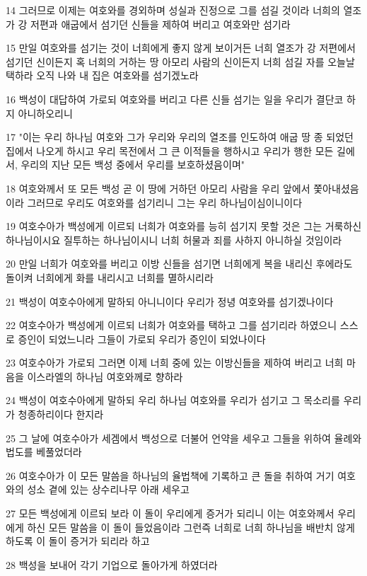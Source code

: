 \par 14 그러므로 이제는 여호와를 경외하며 성실과 진정으로 그를 섬길 것이라 너희의 열조가 강 저편과 애굽에서 섬기던 신들을 제하여 버리고 여호와만 섬기라
\par 15 만일 여호와를 섬기는 것이 너희에게 좋지 않게 보이거든 너희 열조가 강 저편에서 섬기던 신이든지 혹 너희의 거하는 땅 아모리 사람의 신이든지 너희 섬길 자를 오늘날 택하라 오직 나와 내 집은 여호와를 섬기겠노라
\par 16 백성이 대답하여 가로되 여호와를 버리고 다른 신들 섬기는 일을 우리가 결단코 하지 아니하오리니
\par 17 "이는 우리 하나님 여호와 그가 우리와 우리의 열조를 인도하여 애굽 땅 종 되었던 집에서 나오게 하시고 우리 목전에서 그 큰 이적들을 행하시고 우리가 행한 모든 길에서, 우리의 지난 모든 백성 중에서 우리를 보호하셨음이며"
\par 18 여호와께서 또 모든 백성 곧 이 땅에 거하던 아모리 사람을 우리 앞에서 쫓아내셨음이라 그러므로 우리도 여호와를 섬기리니 그는 우리 하나님이심이니이다
\par 19 여호수아가 백성에게 이르되 너희가 여호와를 능히 섬기지 못할 것은 그는 거룩하신 하나님이시요 질투하는 하나님이시니 너희 허물과 죄를 사하지 아니하실 것임이라
\par 20 만일 너희가 여호와를 버리고 이방 신들을 섬기면 너희에게 복을 내리신 후에라도 돌이켜 너희에게 화를 내리시고 너희를 멸하시리라
\par 21 백성이 여호수아에게 말하되 아니니이다 우리가 정녕 여호와를 섬기겠나이다
\par 22 여호수아가 백성에게 이르되 너희가 여호와를 택하고 그를 섬기리라 하였으니 스스로 증인이 되었느니라 그들이 가로되 우리가 증인이 되었나이다
\par 23 여호수아가 가로되 그러면 이제 너희 중에 있는 이방신들을 제하여 버리고 너희 마음을 이스라엘의 하나님 여호와께로 향하라
\par 24 백성이 여호수아에게 말하되 우리 하나님 여호와를 우리가 섬기고 그 목소리를 우리가 청종하리이다 한지라
\par 25 그 날에 여호수아가 세겜에서 백성으로 더불어 언약을 세우고 그들을 위하여 율례와 법도를 베풀었더라
\par 26 여호수아가 이 모든 말씀을 하나님의 율법책에 기록하고 큰 돌을 취하여 거기 여호와의 성소 곁에 있는 상수리나무 아래 세우고
\par 27 모든 백성에게 이르되 보라 이 돌이 우리에게 증거가 되리니 이는 여호와께서 우리에게 하신 모든 말씀을 이 돌이 들었음이라 그런즉 너희로 너희 하나님을 배반치 않게 하도록 이 돌이 증거가 되리라 하고
\par 28 백성을 보내어 각기 기업으로 돌아가게 하였더라
